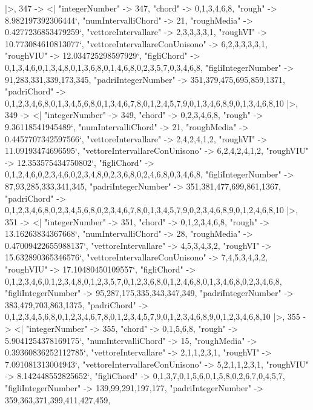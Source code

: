\documentclass[
]{article}
\begin{document}
\begin{DatasetVerbatim}
  |>,
  347 -> <|
    "integerNumber" -> 347,
    "chord" -> {0,1,3,4,6,8},
    "rough" -> 8.982197392306444`,
    "numIntervalliChord" -> 21,
    "roughMedia" -> 0.4277236853479259`,
    "vettoreIntervallare" -> {2,3,3,3,3,1},
    "roughVI" -> 10.773084610813077`,
    "vettoreIntervallareConUnisono" -> {6,2,3,3,3,3,1},
    "roughVIU" -> 12.034725298597929`,
    "figliChord" -> {{0,1,3,4,6},{0,1,3,4,8},{0,1,3,6,8},{0,1,4,6,8},{0,2,3,5,7},{0,3,4,6,8}},
    "figliIntegerNumber" -> {91,283,331,339,173,345},
    "padriIntegerNumber" -> {351,379,475,695,859,1371},
    "padriChord" -> {{0,1,2,3,4,6,8},{0,1,3,4,5,6,8},{0,1,3,4,6,7,8},{0,1,2,4,5,7,9},{0,1,3,4,6,8,9},{0,1,3,4,6,8,10}}
  |>,
  349 -> <|
    "integerNumber" -> 349,
    "chord" -> {0,2,3,4,6,8},
    "rough" -> 9.36118541945489`,
    "numIntervalliChord" -> 21,
    "roughMedia" -> 0.4457707342597566`,
    "vettoreIntervallare" -> {2,4,2,4,1,2},
    "roughVI" -> 11.09193474696595`,
    "vettoreIntervallareConUnisono" -> {6,2,4,2,4,1,2},
    "roughVIU" -> 12.353575434750802`,
    "figliChord" -> {{0,1,2,4,6},{0,2,3,4,6},{0,2,3,4,8},{0,2,3,6,8},{0,2,4,6,8},{0,3,4,6,8}},
    "figliIntegerNumber" -> {87,93,285,333,341,345},
    "padriIntegerNumber" -> {351,381,477,699,861,1367},
    "padriChord" -> {{0,1,2,3,4,6,8},{0,2,3,4,5,6,8},{0,2,3,4,6,7,8},{0,1,3,4,5,7,9},{0,2,3,4,6,8,9},{0,1,2,4,6,8,10}}
  |>,
  351 -> <|
    "integerNumber" -> 351,
    "chord" -> {0,1,2,3,4,6,8},
    "rough" -> 13.16263834367668`,
    "numIntervalliChord" -> 28,
    "roughMedia" -> 0.47009422655988137`,
    "vettoreIntervallare" -> {4,5,3,4,3,2},
    "roughVI" -> 15.632890365346576`,
    "vettoreIntervallareConUnisono" -> {7,4,5,3,4,3,2},
    "roughVIU" -> 17.10480450109557`,
    "figliChord" -> {{0,1,2,3,4,6},{0,1,2,3,4,8},{0,1,2,3,5,7},{0,1,2,3,6,8},{0,1,2,4,6,8},{0,1,3,4,6,8},{0,2,3,4,6,8}},
    "figliIntegerNumber" -> {95,287,175,335,343,347,349},
    "padriIntegerNumber" -> {383,479,703,863,1375},
    "padriChord" -> {{0,1,2,3,4,5,6,8},{0,1,2,3,4,6,7,8},{0,1,2,3,4,5,7,9},{0,1,2,3,4,6,8,9},{0,1,2,3,4,6,8,10}}
  |>,
  355 -> <|
    "integerNumber" -> 355,
    "chord" -> {0,1,5,6,8},
    "rough" -> 5.9041254378169175`,
    "numIntervalliChord" -> 15,
    "roughMedia" -> 0.39360836252112785`,
    "vettoreIntervallare" -> {2,1,1,2,3,1},
    "roughVI" -> 7.091081313004943`,
    "vettoreIntervallareConUnisono" -> {5,2,1,1,2,3,1},
    "roughVIU" -> 8.142448552825652`,
    "figliChord" -> {{0,1,3,7},{0,1,5,6},{0,1,5,8},{0,2,6,7},{0,4,5,7}},
    "figliIntegerNumber" -> {139,99,291,197,177},
    "padriIntegerNumber" -> {359,363,371,399,411,427,459},

\end{DatasetVerbatim}
\end{document}
